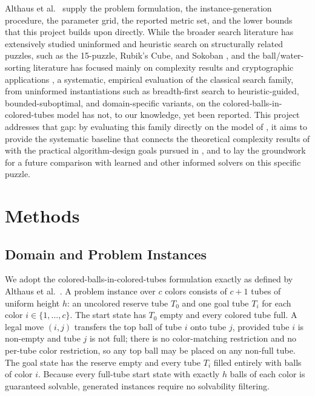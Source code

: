 \documentclass[letterpaper]{article}
\begin{document}
Althaus et al.\ \cite{althaus2025} supply the problem formulation, the
instance-generation procedure, the parameter grid, the reported metric set,
and the lower bounds that this project builds upon directly. While the
broader search literature has extensively studied uninformed and heuristic
search on structurally related puzzles, such as the 15-puzzle, Rubik's
Cube, and Sokoban
\cite{ratner1986,korf1985,korf1997,culberson1998,junghanns2001}, and the
ball/water-sorting literature has focused mainly on complexity results and
cryptographic applications \cite{ito2023,ruangwises2023}, a systematic,
empirical evaluation of the classical search family, from uninformed
instantiations such as breadth-first search to heuristic-guided,
bounded-suboptimal, and domain-specific variants, on the
colored-balls-in-colored-tubes model has not, to our knowledge, yet been
reported. This project addresses that gap: by evaluating this family
directly on the model of \cite{althaus2025}, it aims to provide the
systematic baseline that connects the theoretical complexity results of
\cite{ito2023} with the practical algorithm-design goals pursued in
\cite{althaus2025}, and to lay the groundwork for a future comparison with
learned and other informed solvers on this specific puzzle.

\section{Methods}

\subsection{Domain and Problem Instances}

We adopt the colored-balls-in-colored-tubes formulation exactly as defined by
Althaus et al.\ \cite{althaus2025}. A problem instance over $c$ colors
consists of $c+1$ tubes of uniform height $h$: an uncolored reserve tube
$T_0$ and one goal tube $T_i$ for each color $i \in \{1, \dots, c\}$. The
start state has $T_0$ empty and every colored tube full. A
legal move $(i,j)$ transfers the top ball of tube $i$ onto tube $j$,
provided tube $i$ is non-empty and tube $j$ is not full; there is no
color-matching restriction and no per-tube color restriction, so any top
ball may be placed on any non-full tube. The goal state has the reserve
empty and every tube $T_i$ filled entirely with balls of color $i$. Because
every full-tube start state with exactly $h$ balls of each color is
guaranteed solvable, generated instances require no solvability filtering.
\end{document}
